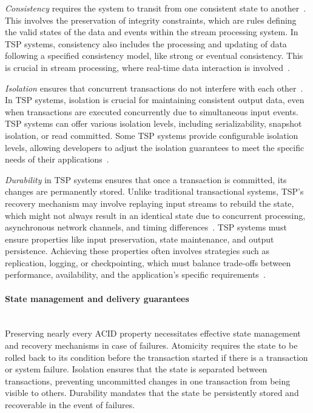 {\em Consistency} requires the system to transit from one consistent state to another~\cite{zhang2024survey}. This involves the preservation of integrity constraints, which are rules defining the valid states of the data and events within the stream processing system. In TSP systems, consistency also includes the processing and updating of data following a specified consistency model, like strong or eventual consistency. This is crucial in stream processing, where real-time data interaction is involved~\cite{affetti2017flowdb, zhang2020towards}.

{\em Isolation} ensures that concurrent transactions do not interfere with each other~\cite{zhang2024survey}. In TSP systems, isolation is crucial for maintaining consistent output data, even when transactions are executed concurrently due to simultaneous input events. TSP systems can offer various isolation levels, including serializability, snapshot isolation, or read committed. Some TSP systems provide configurable isolation levels, allowing developers to adjust the isolation guarantees to meet the specific needs of their applications~\cite{affetti2017flowdb}.

{\em Durability} in TSP systems ensures that once a transaction is committed, its changes are permanently stored. Unlike traditional transactional systems, TSP's recovery mechanism may involve replaying input streams to rebuild the state, which might not always result in an identical state due to concurrent processing, asynchronous network channels, and timing differences~\cite{thepaper}. TSP systems must ensure properties like input preservation, state maintenance, and output persistence. Achieving these properties often involves strategies such as replication, logging, or checkpointing, which must balance trade-offs between performance, availability, and the application's specific requirements~\cite{zhang2024survey}.

\paragraph{State management and delivery guarantees} \mbox{} \\

Preserving nearly every ACID property necessitates effective state management and recovery mechanisms in case of failures. Atomicity requires the state to be rolled back to its condition before the transaction started if there is a transaction or system failure. Isolation ensures that the state is separated between transactions, preventing uncommitted changes in one transaction from being visible to others. Durability mandates that the state be persistently stored and recoverable in the event of failures.

